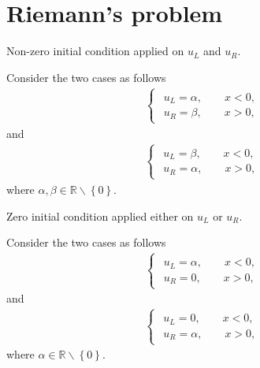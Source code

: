 \documentclass[12pt]{article}
\begin{document}
\section{Riemann's problem}
\begin{example}
	Non-zero initial condition applied on $u_{L}$ and $u_{R}$.
\end{example}
Consider the two cases as follows
\begin{align}
	\begin{cases}
		\begin{aligned}
			u_{L} = \alpha, \qquad x<0, \\
			u_{R} = \beta, \qquad x>0,   
		\end{aligned}
	\end{cases}
\end{align}
and
\begin{align}
	\begin{cases}
		\begin{aligned}
			u_{L} = \beta, \qquad x<0, \\
			u_{R} = \alpha, \qquad x>0,   
		\end{aligned}
	\end{cases}
\end{align}
where $\alpha,\beta \in \mathbb{R}\backslash\left\{0\right\}$.
\clearpage
\begin{example}
	Zero initial condition applied either on $u_{L}$ or $u_{R}$.
\end{example}
Consider the two cases as follows
\begin{align}
	\begin{cases}
		\begin{aligned}
			u_{L} = \alpha, \qquad x<0, \\
			u_{R} = 0, \qquad x>0,   
		\end{aligned}
	\end{cases}
\end{align}
and
\begin{align}
	\begin{cases}
		\begin{aligned}
			u_{L} = 0, \qquad x<0, \\
			u_{R} = \alpha, \qquad x>0,   
		\end{aligned}
	\end{cases}
\end{align}
where $\alpha \in \mathbb{R}\backslash\left\{0\right\}$.
\clearpage
\end{document}
